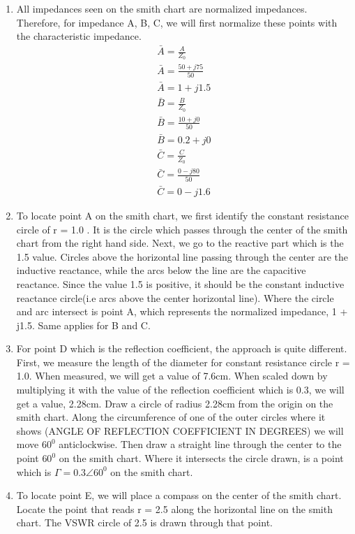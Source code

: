 \begin{example}
\begin{enumerate}
\item All impedances seen on the smith chart are normalized impedances. Therefore, for impedance A, B, C, we will first normalize these points with the characteristic impedance.\\
\begin{align*}
\bar{A}=\frac{A}{Z_{0}}\\
\bar{A}=\frac{50 + j75}{50}\\
\bar{A}=1+j1.5\\
\bar{B}=\frac{B}{Z_{0}}\\
\bar{B}= \frac{10 + j0}{50}\\
\bar{B}=0.2+j0\\
\bar{C}=\frac{C}{Z_{0}}\\
\bar{C}= \frac{0 - j80}{50}\\
\bar{C}=0-j1.6
\end{align*}

\item To locate point A on the smith chart, we first identify the constant resistance circle of r = 1.0 . It is the circle which passes through the center of the smith chart from the right hand side. Next, we go to the reactive part which is the 1.5 value. Circles above the horizontal line passing through the center are the inductive reactance, while the arcs below the line are the capacitive reactance. Since the value 1.5 is positive, it should be the constant inductive reactance circle(i.e arcs above the center horizontal line). Where the circle and arc intersect is point A, which represents the normalized impedance, 1 + j1.5. Same applies for B and C.

\item For point D which is the reflection coefficient, the approach is quite different. First, we measure the length of the diameter for constant resistance circle r = 1.0. When measured, we will get a value of 7.6cm. When scaled down by multiplying it with the value of the reflection coefficient which is 0.3, we will get a value, 2.28cm. Draw a circle of radius 2.28cm from the origin on the smith chart. Along the circumference of one of the outer circles where it shows (ANGLE OF REFLECTION COEFFICIENT IN DEGREES) we will move $60^0$ anticlockwise. Then draw a straight line through the center to the point $60^0$ on the smith chart. Where it intersects the circle drawn, is a point  which is $\Gamma = 0.3\angle60^{0}$ on the smith chart.

\item To locate point E, we will place a compass on the center of the smith chart. Locate the point that reads r = 2.5 along the horizontal line on the smith chart. The VSWR circle of 2.5 is drawn through that point.


\end{enumerate}
\end{example}
